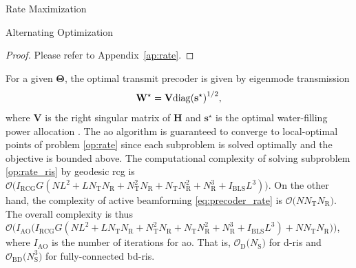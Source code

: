 \documentclass[journal]{IEEEtran}
\begin{document}
\begin{section}{Rate Maximization}
\begin{subsection}{Alternating Optimization}
		\begin{proof}
			Please refer to Appendix~\ref{ap:rate}.
		\end{proof}
		For a given $\mathbf{\Theta}$, the optimal transmit precoder is given by eigenmode transmission \cite{Clerckx2013}
		\begin{equation}
			\label{eq:precoder_rate}
			\mathbf{W}^\star = \mathbf{V} {\operatorname{diag}(\mathbf{s}^\star)}^{1/2},
		\end{equation}
		where $\mathbf{V}$ is the right singular matrix of $\mathbf{H}$ and $\mathbf{s}^\star$ is the optimal water-filling power allocation \cite{Clerckx2013}.
		The \gls{ao} algorithm is guaranteed to converge to local-optimal points of problem \eqref{op:rate} since each subproblem is solved optimally and the objective is bounded above.
		The computational complexity of solving subproblem \eqref{op:rate_ris} by geodesic \gls{rcg} is $\mathcal{O}\bigl(I_\text{RCG} G (NL^2 + L N_\mathrm{T} N_\mathrm{R} + N_\mathrm{T}^2 N_\mathrm{R} + N_\mathrm{T} N_\mathrm{R}^2 + N_\mathrm{R}^3 + I_\text{BLS} L^3)\bigr)$.
		On the other hand, the complexity of active beamforming \eqref{eq:precoder_rate} is $\mathcal{O}\bigl(N N_\mathrm{T} N_\mathrm{R}\bigr)$.
		The overall complexity is thus $\mathcal{O}\bigl(I_\text{AO}\bigl(I_\text{RCG} G (NL^2 + L N_\mathrm{T} N_\mathrm{R} + N_\mathrm{T}^2 N_\mathrm{R} + N_\mathrm{T} N_\mathrm{R}^2 + N_\mathrm{R}^3 + I_\text{BLS} L^3) + N N_\mathrm{T} N_\mathrm{R}\bigr)\bigr)$, where $I_\text{AO}$ is the number of iterations for \gls{ao}.
		That is, $\mathcal{O}_\mathrm{D}\bigl(N_\mathrm{S}\bigr)$ for \gls{d}-\gls{ris} and $\mathcal{O}_\mathrm{BD}\bigl(N_\mathrm{S}^3\bigr)$ for fully-connected \gls{bd}-\gls{ris}.
	\end{subsection}


\end{section}
\end{document}
